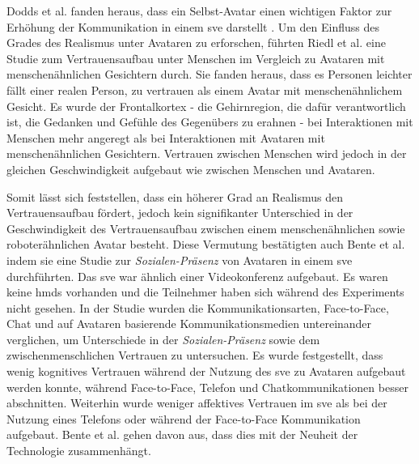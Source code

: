 \documentclass[a4paper,11pt]{article}%
\renewcommand{\\}{\vspace*{0.5\baselineskip} \newline}
\begin{document}
Dodds et al. fanden heraus, dass ein Selbst-Avatar einen wichtigen Faktor zur Erhöhung der Kommunikation in einem \ac{sve} darstellt \citep[1-11]{dodds2011talk}.
\label{AvatarTrust}
Um den Einfluss des Grades des Realismus unter Avataren zu erforschen, führten Riedl et al. \citep{riedl2014trusting} eine Studie zum Vertrauensaufbau unter Menschen im Vergleich zu Avataren mit menschenähnlichen Gesichtern durch. Sie fanden heraus, dass es Personen leichter fällt einer realen Person, zu vertrauen als einem Avatar mit menschenähnlichem Gesicht. Es wurde der Frontalkortex - die Gehirnregion, die dafür verantwortlich ist, die Gedanken und Gefühle des Gegenübers zu erahnen - bei Interaktionen mit Menschen mehr angeregt als bei Interaktionen mit Avataren mit menschenähnlichen Gesichtern.
Vertrauen zwischen Menschen wird jedoch in der gleichen Geschwindigkeit aufgebaut wie zwischen Menschen und Avataren.

Somit lässt sich feststellen, dass ein höherer Grad an Realismus den Vertrauensaufbau fördert, jedoch kein signifikanter Unterschied in der Geschwindigkeit  des Vertrauensaufbau zwischen einem menschenähnlichen sowie roboterähnlichen Avatar besteht. Diese Vermutung bestätigten auch Bente et al. \citep[S.54-59]{bente2004social} indem sie eine Studie zur \textit{Sozialen-Präsenz} von Avataren in einem \ac{sve} durchführten. Das \ac{sve} war ähnlich einer Videokonferenz aufgebaut. Es waren keine \ac{hmd}s vorhanden und die Teilnehmer haben sich während des Experiments nicht gesehen. In der Studie wurden die Kommunikationsarten, Face-to-Face, Chat und auf Avataren basierende Kommunikationsmedien untereinander verglichen, um Unterschiede in der \textit{Sozialen-Präsenz} sowie dem zwischenmenschlichen Vertrauen zu untersuchen.
Es wurde festgestellt, dass wenig kognitives Vertrauen während der Nutzung des \ac{sve} zu Avataren aufgebaut werden konnte, während Face-to-Face, Telefon und Chatkommunikationen besser abschnitten. Weiterhin wurde weniger affektives Vertrauen im \ac{sve} als bei der Nutzung eines Telefons oder während der Face-to-Face Kommunikation aufgebaut.
Bente et al. \citep[S.54-59]{bente2004social} gehen davon aus, dass dies mit der Neuheit der Technologie zusammenhängt.
\end{document}
